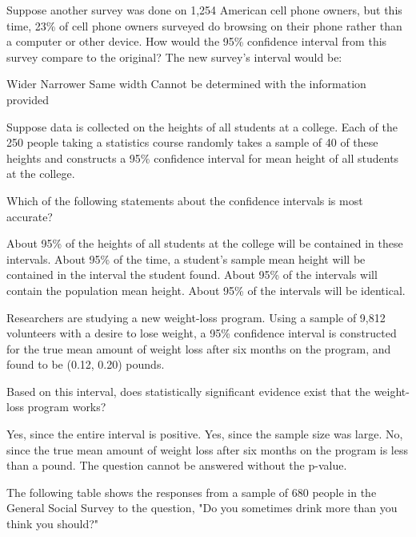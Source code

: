 \documentclass{article}
\begin{document}
\begin{mcquestions}
		Suppose another survey was done on 1,254 American cell phone owners, but this time, 23\% of cell phone owners surveyed do browsing on their phone rather than a computer or other device.  How would the 95\% confidence interval from this survey compare to the original? The new survey's interval would be:
		\begin{mcanswerslist}
			\answer[correct]  Wider
			\answer Narrower
			\answer Same width
			\answer Cannot be determined with the information provided
		\end{mcanswerslist}
		
		\question Suppose data is collected on the heights of all students at a college.  Each of the 250 people taking a statistics course randomly takes a sample of 40 of these heights and constructs a 95\% confidence interval for mean height of all students at the college.
		
		Which of the following statements about the confidence intervals is most accurate?
		\begin{mcanswerslist}
			\answer About 95\% of the heights of all students at the college will be contained in these intervals.
			\answer About 95\% of the time, a student's sample mean height will be contained in the interval the student found.
			\answer[correct] About 95\% of the intervals will contain the population mean height.
			\answer About 95\% of the intervals will be identical.
		\end{mcanswerslist}
		
		\question Researchers are studying a new weight-loss program. Using a sample of 9,812 volunteers with a desire to lose weight, a 95\% confidence interval is constructed for the true mean amount of weight loss after six months on the program, and found to be (0.12, 0.20) pounds.
		
		Based on this interval, does statistically significant evidence exist that the weight-loss program works?
		\begin{mcanswerslist}
			\answer[correct] Yes, since the entire interval is positive.
			\answer Yes, since the sample size was large.
			\answer No, since the true mean amount of weight loss after six months on the program is less than a pound.
			\answer The question cannot be answered without the p-value.
		\end{mcanswerslist}
		
		\begin{mcquestioninstruction}
			The following table shows the responses from a sample of 680 people in the General Social Survey to the question, "Do you sometimes drink more than you think you should?"\\
			

\end{mcquestioninstruction}
\end{mcquestions}
\end{document}
